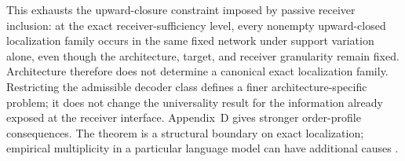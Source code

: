 This exhausts the upward-closure constraint imposed by passive receiver inclusion: at the exact receiver-sufficiency level, every nonempty upward-closed localization family occurs in the same fixed network under support variation alone, even though the architecture, target, and receiver granularity remain fixed. Architecture therefore does not determine a canonical exact localization family. Restricting the admissible decoder class defines a finer architecture-specific problem; it does not change the universality result for the information already exposed at the receiver interface. Appendix~D gives stronger order-profile consequences. The theorem is a structural boundary on exact localization; empirical multiplicity in a particular language model can have additional causes \citep{meloux2025identifiable,chen2026allcircuits}.
